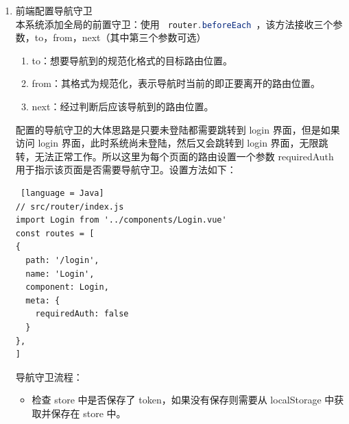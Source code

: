 \begin{enumerate}
\begin{lstlisting} [language = Java]
    \end{lstlisting}
        \begin{enumerate}
          \item 在 auth.js 的 state 中： 创建一个 authDate 对象，其中保存用户的Token，refreshToken，tokenExp，userId，userName，userType，以及一个loginStatus。
          \item 在 auth.js 的 getter 中：创建 getLoginStatus() 用于获取用户的登陆状态（是否登陆），创建 getAuthDate() 用于获取用户的身份信息，创建 isTokenActive() 用于判断 Token 是否过期。
          \item 在 auth.js 的 mutations 中：创建 saveTokenDate() 用于更新 authDate 以及 将 token 保存在浏览器的 localStorage 中。创建 setLoginStatus() 用于更新登陆状态。创建 signout() 用于登出（清除localStorage中的Token，以及将登陆状态更改为未登陆）。
          \item 在 auth.js 的 actions 中：创建异步函数 login() 用于登陆（使用 axios 发送请求，将 paylaod(username, password, usertype) 放在请求体中发送给后端，使用 mutations 中方法处理返回的结果，成功登陆。
        \end{enumerate}
  \item 前端配置导航守卫\\
        本系统添加全局的前置守卫：使用 \lstinline[language = Java]| router.beforeEach |，该方法接收三个参数，to，from，next（其中第三个参数可选）
        \begin{enumerate}
          \item to：想要导航到的规范化格式的目标路由位置。
          \item from：其格式为规范化，表示导航时当前的即正要离开的路由位置。
          \item next：经过判断后应该导航到的路由位置。
        \end{enumerate}
        配置的导航守卫的大体思路是只要未登陆都需要跳转到 login 界面，但是如果访问 login 界面，此时系统尚未登陆，然后又会跳转到 login 界面，无限跳转，无法正常工作。所以这里为每个页面的路由设置一个参数 requiredAuth 用于指示该页面是否需要导航守卫。设置方法如下：
        \begin{lstlisting} [language = Java]
// src/router/index.js
import Login from '../components/Login.vue'
const routes = [
{
  path: '/login',
  name: 'Login',
  component: Login,
  meta: {
    requiredAuth: false
  }
},
]
    \end{lstlisting}
        导航守卫流程：
        \begin{itemize}
          \item 检查 store 中是否保存了 token，如果没有保存则需要从 localStorage 中获取并保存在 store 中。

\end{itemize}
\end{enumerate}
